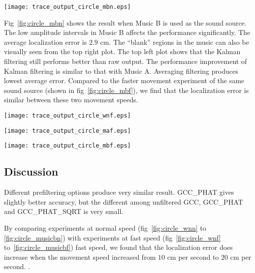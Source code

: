 \begin{figure*}[h!]
\centering
\texttt{[image: trace\_output\_circle\_mbn.eps]}
\caption{music B ($10$ cm per second)}
\label{fig:circle_musicbn}
\end{figure*}

Fig~\ref{fig:circle_mbn} shows the result when Music B is used as the sound source.  The low amplitude intervals in Music B affects the performance significantly. The average localization error is $2.9$ cm. The ``blank'' regions in the music can also be visually seen from the top right plot. The top left plot shows that the Kalman filtering still performs better than raw output. The performance improvement of Kalman filtering is similar to that with Music A. Averaging filtering produces lowest average error. Compared to the faster movement experiment of the same sound source (shown in fig~\ref{fig:circle_mbf}), we find that the localization error is similar between these two movement speeds.

\begin{figure*}[h!]
\centering
\texttt{[image: trace\_output\_circle\_wnf.eps]}
\caption{white noise ($20$ cm per second)}
\label{fig:circle_wnf}
\end{figure*}

\begin{figure*}[h!]
\centering
  \texttt{[image: trace\_output\_circle\_maf.eps]}
  \caption{music A ($20$ cm per second)}
  \label{fig:circle_musicaf}
\end{figure*}

\begin{figure*}[h!]
\centering
  \texttt{[image: trace\_output\_circle\_mbf.eps]}
  \caption{music B ($20$ cm per second)}
  \label{fig:circle_musicbf}
\end{figure*}

\subsection{Discussion}

Different prefiltering options produce very similar result. GCC\_PHAT gives slightly better accuracy, but the different among unfiltered GCC, GCC\_PHAT and GCC\_PHAT\_SQRT is very small.

By comparing experiments at normal speed (fig~\ref{fig:circle_wnn} to \ref{fig:circle_musicbn}) with experiments at fast speed (fig~\ref{fig:circle_wnf} to~\ref{fig:circle_musicbf}) fast speed, we found that the localization error does increase when the movement speed increased from $10$ cm per second to $20$ cm per second. . 

